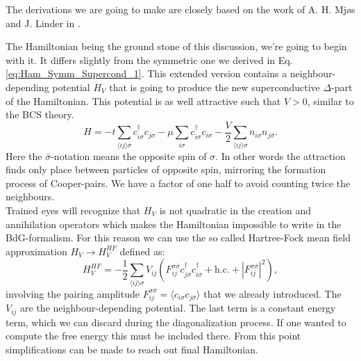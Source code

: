 \documentclass[../main.tex]{subfile}
\begin{document}
The derivations we are going to make are closely based on the work of A. H. Mjøs and J. Linder in \cite{Mjos2019}.

The Hamiltonian being the ground stone of this 
discussion, we're going to begin with it. It differs slightly from the symmetric one we derived in Eq. \ref{eq:Ham_Symm_Supercond_1}. This extended version contains a neighbour-depending potential 
$H_V$ that is going to 
produce the new superconductive $\Delta$-part of the Hamiltonian. This potential is as well attractive such that $V>0$, similar to the BCS theory.
\begin{equation}
    H = -t\sum_{\langle ij\rangle \sigma} c_{i\sigma}^{\dagger}c_{j\sigma} - \mu \sum_{i\sigma} c_{i\sigma}^{\dagger}c_{i\sigma} - \frac{V}{2} \sum_{\langle ij\rangle \sigma} n_{i\sigma}n_{j\bar{\sigma}}.
\end{equation}
Here the $\bar{\sigma}$-notation means the opposite spin of $\sigma$. In other words the attraction finds only place between particles of opposite spin,
 mirroring the formation process of Cooper-pairs.
We have a factor of one half to avoid counting twice the neighbours.\\

Trained eyes will recognize that $H_V$ is not quadratic in the creation and annihilation operators which makes the Hamiltonian impossible to write in the BdG-formalism. For this reason we can 
use the so called Hartree-Fock mean field approximation $H_V \rightarrow H^{HF}_V$ defined as:
\begin{equation}
    H^{HF}_V = -\frac{1}{2} \sum_{\langle ij\rangle \sigma} V_{ij} \left(F_{ij}^{\sigma \bar{\sigma}} c^{\dagger}_{j\bar{\sigma}}c^{\dagger}_{i\sigma} + \text{h.c.} 
    + |F_{ij}^{\sigma \bar{\sigma}}|^2\right),
\end{equation}
involving the pairing amplitude $F_{ij}^{\sigma \bar{\sigma}} = \langle c_{i\sigma}c_{j\bar{\sigma}}\rangle$ that we already introduced. The $V_{ij}$ are the neighbour-depending potential.
The last term is a constant energy term, which we can discard during the diagonalization process. If one wanted to compute the free energy this must be included there.
From this point simplifications can be made to reach out final Hamiltonian.\\
\end{document}

